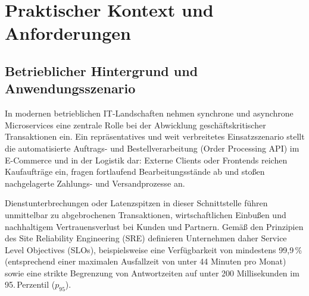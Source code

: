 \chapter{Praktischer Kontext und Anforderungen}
\label{chap:praxiskontext-anforderungen}

\section{Betrieblicher Hintergrund und Anwendungsszenario}
\label{sec:betrieblicher-hintergrund}
In modernen betrieblichen IT-Landschaften nehmen synchrone und asynchrone Microservices eine zentrale Rolle bei der Abwicklung geschäftskritischer Transaktionen ein. Ein repräsentatives und weit verbreitetes Einsatzszenario stellt die automatisierte Auftrags- und Bestellverarbeitung (Order Processing API) im E-Commerce und in der Logistik dar: Externe Clients oder Frontends reichen Kaufaufträge ein, fragen fortlaufend Bearbeitungsstände ab und stoßen nachgelagerte Zahlungs- und Versandprozesse an.

Dienstunterbrechungen oder Latenzspitzen in dieser Schnittstelle führen unmittelbar zu abgebrochenen Transaktionen, wirtschaftlichen Einbußen und nachhaltigem Vertrauensverlust bei Kunden und Partnern. Gemäß den Prinzipien des Site Reliability Engineering (SRE) definieren Unternehmen daher Service Level Objectives (SLOs), beispielsweise eine Verfügbarkeit von mindestens 99{,}9\,\% (entsprechend einer maximalen Ausfallzeit von unter 44 Minuten pro Monat) sowie eine strikte Begrenzung von Antwortzeiten auf unter 200 Millisekunden im 95.\,Perzentil ($p_{95}$).


